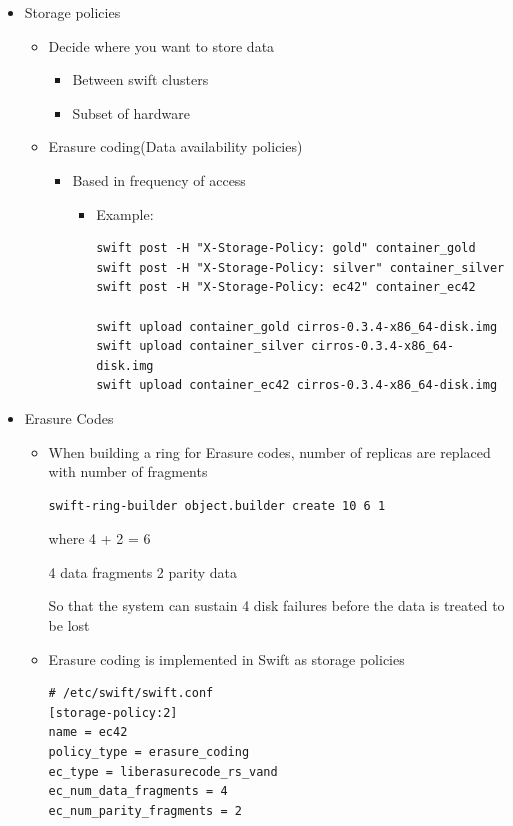 \documentclass{article}
\begin{document}
\begin{itemize}
\item Storage policies
\begin{itemize}
\item Decide where you want to store data
\begin{itemize}
\item Between swift clusters
\item Subset of hardware
\end{itemize}
\item Erasure coding(Data availability policies)
\begin{itemize}
\item Based in frequency of access
\begin{itemize}
\item Example:
\begin{verbatim}
swift post -H "X-Storage-Policy: gold" container_gold
swift post -H "X-Storage-Policy: silver" container_silver
swift post -H "X-Storage-Policy: ec42" container_ec42

swift upload container_gold cirros-0.3.4-x86_64-disk.img
swift upload container_silver cirros-0.3.4-x86_64-disk.img
swift upload container_ec42 cirros-0.3.4-x86_64-disk.img
\end{verbatim}
\end{itemize}
\end{itemize}
\end{itemize}

\item Erasure Codes
\begin{itemize}
\item When building a ring for Erasure codes, number of replicas are
replaced with number of fragments

\begin{verbatim}
swift-ring-builder object.builder create 10 6 1
\end{verbatim}

where 4 + 2 = 6

4 data fragments
2 parity data

    So that the system can sustain 4 disk failures before the data is
treated to be lost

\item Erasure coding is implemented in Swift as storage policies

\begin{verbatim}
# /etc/swift/swift.conf
[storage-policy:2]
name = ec42
policy_type = erasure_coding
ec_type = liberasurecode_rs_vand
ec_num_data_fragments = 4
ec_num_parity_fragments = 2
\end{verbatim}


\end{itemize}
\end{itemize}
\end{document}
